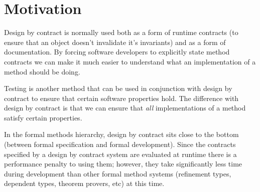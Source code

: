 \section{Motivation}

Design by contract is normally used both as a form of runtime contracts (to ensure that an object doesn't invalidate it's invariants) and as a form of documentation. By forcing software developers to explicitly state method contracts we can make it much easier to understand what an implementation of a method should be doing.

Testing is another method that can be used in conjunction with design by contract to ensure that certain software properties hold. The difference with design by contract is that we can ensure that \emph{all} implementations of a method satisfy certain properties.

In the formal methods hierarchy, design by contract sits close to the bottom (between formal specification and formal development). Since the contracts specified by a design by contract system are evaluated at runtime there is a performance penalty to using them; however, they take significantly less time during development than other formal method systems (refinement types, dependent types, theorem provers, etc) at this time.
